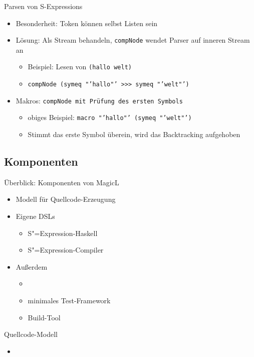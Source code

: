 \documentclass{beamer}
\newcommand{\sexp}{S"=Expression}
\begin{document}
\begin{frame}{Parsen von S-Expressions}
  \begin{itemize}
  \item Besonderheit: Token können selbst Listen sein
  \item Lösung: Als Stream behandeln, \texttt{compNode} wendet Parser
    auf inneren Stream an
    \begin{itemize}
    \item Beispiel: Lesen von \texttt{(hallo welt)}
    \item \texttt{compNode (symeq "'hallo"' >>> symeq "'welt"') } %
    \end{itemize}
  \item Makros: \texttt{compNode mit Prüfung des ersten Symbols}
    \begin{itemize}
    \item obiges Beispiel: \texttt{macro "'hallo"' (symeq "'welt"')}
    \item Stimmt das erste Symbol überein, wird das Backtracking aufgehoben
    \end{itemize}
  \end{itemize}
\end{frame}

\subsection{Komponenten}

\begin{frame}{Überblick: Komponenten von MagicL}
  \begin{itemize}
  \item Modell für Quellcode-Erzeugung
  \item Eigene DSLs
    \begin{itemize}
    \item \sexp{}-Haskell
    \item \sexp{}-Compiler
    \end{itemize}
  \item Außerdem
    \begin{itemize}
    \item \item minimales Test-Framework
    \item Build-Tool
    \end{itemize}
  \end{itemize}
\end{frame}

\begin{frame}[fragile]{Quellcode-Modell}
  \begin{itemize}
  \item 
  \end{itemize}
\end{frame}
\end{document}
